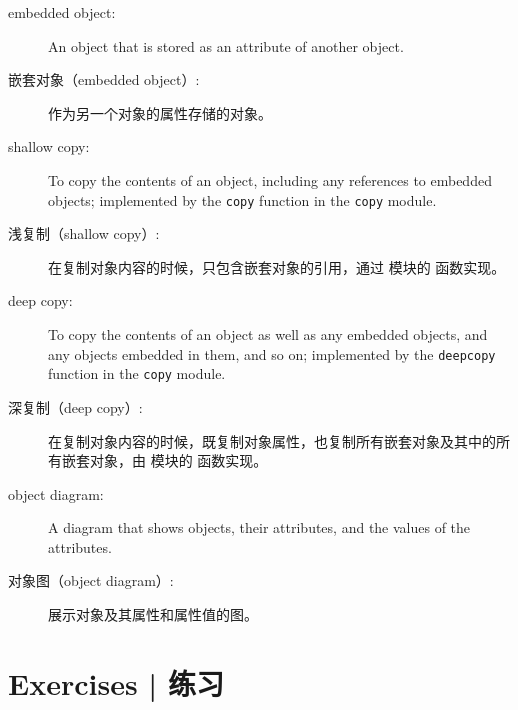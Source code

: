 \begin{description}
\item[embedded object:] An object that is stored as an attribute
of another object.

\item[嵌套对象（embedded object）:] 作为另一个对象的属性存储的对象。
  

\item[shallow copy:] To copy the contents of an object, including
any references to embedded objects;
implemented by the {\tt copy} function in the {\tt copy} module.

\item[浅复制（shallow copy）:]在复制对象内容的时候，只包含嵌套对象的引用，通过  模块的  函数实现。

\item[deep copy:] To copy the contents of an object as well as any
embedded objects, and any objects embedded in them, and so on;
implemented by the {\tt deepcopy} function in the {\tt copy} module.

\item[深复制（deep copy）:]在复制对象内容的时候，既复制对象属性，也复制所有嵌套对象及其中的所有嵌套对象，由  模块的  函数实现。

\item[object diagram:] A diagram that shows objects, their
attributes, and the values of the attributes.

\item[对象图（object diagram）:] 展示对象及其属性和属性值的图。
  

\end{description}


\section{Exercises  |  练习}

